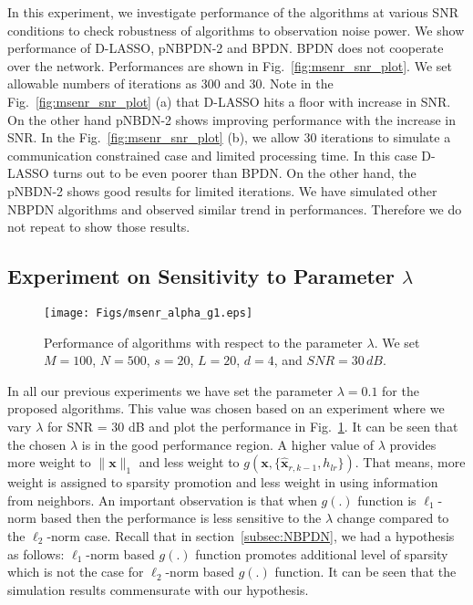 \documentclass[journal]{IEEEtran}
\newcommand{\mbx}{\mathbf{x}}
\begin{document}
In this experiment, we investigate performance of the algorithms at various SNR conditions to check robustness of algorithms to observation noise power. We show performance of D-LASSO, pNBPDN-2 and BPDN. BPDN does not cooperate over the network. Performances are shown in Fig.~\ref{fig:msenr_snr_plot}. We set allowable numbers of iterations as 300 and 30. Note in the Fig.~\ref{fig:msenr_snr_plot} (a) that D-LASSO hits a floor with increase in SNR. On the other hand pNBDN-2 shows improving performance with the increase in SNR. In the Fig.~\ref{fig:msenr_snr_plot} (b), we allow 30 iterations to simulate a communication constrained case and limited processing time. In this case D-LASSO turns out to be even poorer than BPDN. On the other hand, the pNBDN-2 shows good results for limited iterations. We have simulated other NBPDN algorithms and observed similar trend in performances. Therefore we do not repeat to show those results. 


\subsection{Experiment on Sensitivity to Parameter $\lambda$}
\begin{figure}
\hspace{-5mm}
\texttt{[image: Figs/msenr\_alpha\_g1.eps]}
\caption{Performance of algorithms with respect to the parameter $\lambda$. We set $M = 100$, $N = 500$, $s = 20$, $L = 20$, $d = 4$, and $SNR = 30 \, dB$.}
\label{fig:msenr_alpha_plot}
\end{figure}

In all our previous experiments we have set the parameter $\lambda = 0.1$ for the proposed algorithms. This value was chosen based on an experiment where we vary $\lambda$ for SNR = 30 dB and plot the performance in Fig.~\ref{fig:msenr_alpha_plot}. It can be seen that the chosen $\lambda$ is in the good performance region. 
A higher value of $\lambda$ provides more weight to $\|\mathbf{x}\|_{1}$ and less weight to $g(\mbx,\{\hat{\mbx}_{r,k-1}, h_{lr}\})$. That means, more weight is assigned to sparsity promotion and less weight in using information from neighbors. An important observation is that when $g(.)$ function is $\ell_1$-norm based then the performance is less sensitive to the $\lambda$ change compared to the $\ell_2$-norm case.
Recall that in section~\ref{subsec:NBPDN}, we had a hypothesis as follows: $\ell_1$-norm based $g(.)$ function promotes additional level of sparsity which is not the case for $\ell_2$-norm based $g(.)$ function. It can be seen that the simulation results commensurate with our hypothesis.
\end{document}
